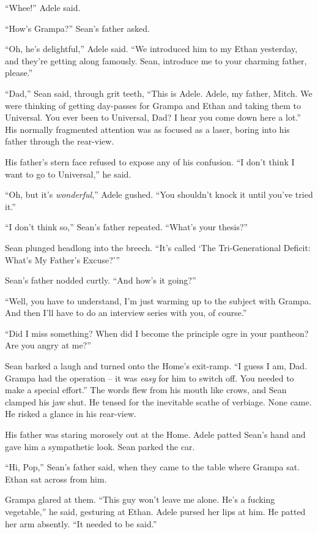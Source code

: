 “Whee!” Adele said.

“How's Grampa?” Sean's father asked.

“Oh, he's delightful,” Adele said. “We introduced him to my Ethan 
yesterday, and they're getting along famously. Sean, introduce me to 
your charming father, please.”

“Dad,” Sean said, through grit teeth, “This is Adele. Adele, my 
father, Mitch. We were thinking of getting day-passes for Grampa and 
Ethan and taking them to Universal. You ever been to Universal, Dad? I 
hear you come down here a lot.” His normally fragmented attention was 
as focused as a laser, boring into his father through the rear-view.

His father's stern face refused to expose any of his confusion. “I 
don't think I want to go to Universal,” he said.

“Oh, but it's \emph{wonderful},” Adele gushed. “You shouldn't 
knock it until you've tried it.”

“I don't think so,” Sean's father repeated. “What's your 
thesis?”

Sean plunged headlong into the breech. “It's called `The 
Tri-Generational Deficit: What's My Father's Excuse?'”

Sean's father nodded curtly. “And how's it going?”

“Well, you have to understand, I'm just warming up to the subject 
with Grampa. And then I'll have to do an interview series with you, of 
course.”

“Did I miss something? When did I become the principle ogre in your 
pantheon? Are you angry at me?”

Sean barked a laugh and turned onto the Home's exit-ramp. “I guess I 
am, Dad. Grampa had the operation -- it was \emph{easy} for him to 
switch off. You needed to make a special effort.” The words flew from 
his mouth like crows, and Sean clamped his jaw shut. He tensed for the 
inevitable scathe of verbiage. None came. He risked a glance in his 
rear-view.

His father was staring morosely out at the Home. Adele patted Sean's 
hand and gave him a sympathetic look. Sean parked the car.

\tb

“Hi, Pop,” Sean's father said, when they came to the table where 
Grampa sat. Ethan sat across from him.

Grampa glared at them. “This guy won't leave me alone. He's a fucking 
vegetable,” he said, gesturing at Ethan. Adele pursed her lips at 
him. He patted her arm absently. “It needed to be said.”

